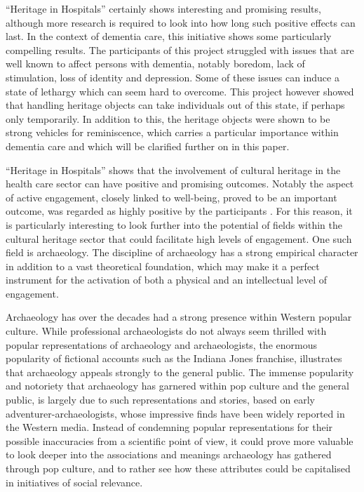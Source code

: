 	“Heritage in Hospitals” certainly shows interesting and promising results, although more research is required to look into how long such positive effects can last. In the context of dementia care, this initiative shows some particularly compelling results. The participants of this project struggled with issues that are well known to affect persons with dementia, notably boredom, lack of stimulation, loss of identity and depression. Some of these issues can induce a state of lethargy which can seem hard to overcome. This project however showed that handling heritage objects can take individuals out of this state, if perhaps only temporarily. In addition to this, the heritage objects were shown to be strong vehicles for reminiscence, which carries a particular importance within dementia care and which will be clarified further on in this paper.	
	
	
	“Heritage in Hospitals” shows that the involvement of cultural heritage in the health care sector can have positive and promising outcomes. Notably the aspect of active engagement, closely linked to well-being, proved to be an important outcome, was regarded as highly positive by the participants \parencite[235--236]{AnderE_2013}. For this reason, it is particularly interesting to look further into the potential of fields within the cultural heritage sector that could facilitate high levels of engagement. One such field is archaeology. The discipline of archaeology has a strong empirical character in addition to a vast theoretical foundation, which may make it a perfect instrument for the activation of both a physical and an intellectual level of engagement.	
	
	
	Archaeology has over the decades had a strong presence within Western popular culture. While professional archaeologists do not always seem thrilled with popular representations of archaeology and archaeologists, the enormous popularity of fictional accounts such as the Indiana Jones franchise, illustrates that archaeology appeals strongly to the general public. The immense popularity and notoriety that archaeology has garnered within pop culture and the general public, is largely due to such representations and stories, based on early adventurer-archaeologists, whose impressive finds have been widely reported in the Western media. Instead of condemning popular representations for their possible inaccuracies from a scientific point of view, it could prove more valuable to look deeper into the associations and meanings archaeology has gathered through pop culture, and to rather see how these attributes could be capitalised in initiatives of social relevance.	
	
